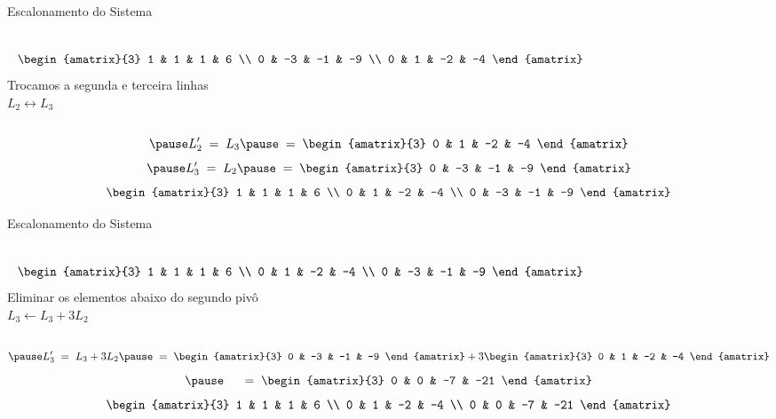 \begin{resolution}{Escalonamento do Sistema}
\begin{columns}
  \[\;\;\,
  \begin{amatrix}{3}
      1 & 1  & 1  & 6  \\
      0 & -3 & -1 & -9 \\
      0 & 1  & -2 & -4
  \end{amatrix}
  \]
  \pause
{}
  Trocamos a segunda e terceira linhas
  \\
  \(
    L_2\leftrightarrow L_3
  \)
\end{columns}
\vspace{-\baselineskip}
\[
  \pause
  L'_2
  \;=\;
  L_3
  \pause
  \;=\;
  \begin{amatrix}{3}
    0 & 1  & -2 & -4
  \end{amatrix}
\]
\[
  \pause
  L'_3
  \;=\;
  L_2
  \pause
  \;=\;
  \begin{amatrix}{3}
    0 & -3 & -1 & -9
  \end{amatrix}
\]
\pause
\[
  \begin{amatrix}{3}
    1 & 1  & 1  & 6  \\
    0 & 1  & -2 & -4 \\
    0 & -3 & -1 & -9
  \end{amatrix}
\]
\end{resolution}

\begin{resolution}{Escalonamento do Sistema}
\begin{columns}
  \[\;\;\,
  \begin{amatrix}{3}
      1 & 1  & 1  & 6  \\
      0 & 1  & -2 & -4 \\
      0 & -3 & -1 & -9
  \end{amatrix}
  \]
  \pause
{}
  Eliminar os elementos abaixo do segundo pivô
  \\ \pause
  \(
    L_3 \leftarrow L_3 + 3 L_2
  \)
\end{columns}
\vspace{-\baselineskip}
\[
  \pause
  L'_3
  \;=\;
    L_3 + 3 L_2
  \pause
  \;=\;
  \begin{amatrix}{3}
    0 & -3 & -1 & -9
  \end{amatrix}
  + 3
  \begin{amatrix}{3}
    0 & 1  & -2 & -4
  \end{amatrix}
\]
\[
  \pause
  \hphantom{L'_3}
  \;=\;
  \begin{amatrix}{3}
    0 & 0 & -7 & -21
  \end{amatrix}
\]
\pause
\[
  \begin{amatrix}{3}
    1 & 1 & 1  & 6   \\
    0 & 1 & -2 & -4  \\
    0 & 0 & -7 & -21
  \end{amatrix}
\]
\end{resolution}

